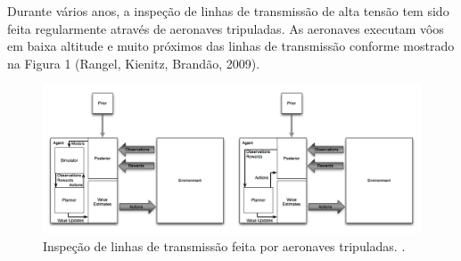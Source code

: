 Durante vários anos, a inspeção de linhas de transmissão de alta tensão tem sido feita regularmente através de aeronaves tripuladas. As aeronaves executam vôos em baixa altitude e muito próximos das linhas de transmissão conforme mostrado na  Figura 1 (Rangel, Kienitz, Brandão, 2009).
\begin{figure} [h!]												%
	\centering													%
	\includegraphics[width=1.0\textwidth]{./asmuth}				%
	\caption{Inspeção de linhas de transmissão feita por aeronaves tripuladas. \cite{asm:13}.}			%
	\label{asmuth}												%
\end{figure}													%

